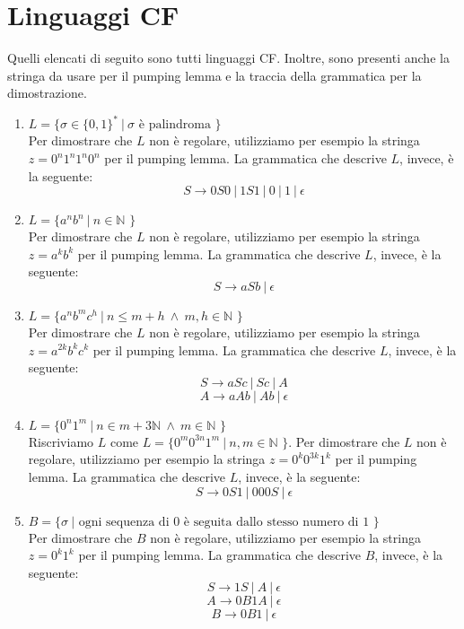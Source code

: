 \documentclass[a4paper,oneside,titlepage]{book}
\begin{document}
\section{Linguaggi CF}
Quelli elencati di seguito sono tutti linguaggi CF. Inoltre, sono presenti anche la stringa da usare per il pumping lemma e la traccia della grammatica per la dimostrazione.
\begin{enumerate}[label=\fbox{\arabic*}]
\item $L = \text{\{ } \sigma \in \{0,1\}^*  \ | \  \sigma \text{ è palindroma \}}$
\\ Per dimostrare che $L$ non è regolare, utilizziamo per esempio la stringa $z = 0^n 1^n 1^n 0^n$ per il pumping lemma. La grammatica che descrive $L$, invece, è la seguente:
\[ S \longrightarrow 0S0 \ | \  1S1 \ | \  0 \ | \  1 \ | \  \epsilon \]

\item $L = \text{\{ } a^n b^n \ | \  n \in \mathbb{N} \text{ \}}$
\\ Per dimostrare che $L$ non è regolare, utilizziamo per esempio la stringa $z = a^k b^k$ per il pumping lemma. La grammatica che descrive $L$, invece, è la seguente:
\[ S \longrightarrow aSb \ | \ \epsilon \]

\item $L = \text{\{ } a^n b^m c^h \ | \  n \leq m + h \ \wedge \ m,h \in \mathbb{N} \text{ \}}$
\\ Per dimostrare che $L$ non è regolare, utilizziamo per esempio la stringa $z = a^{2k} b^k c^k$ per il pumping lemma. La grammatica che descrive $L$, invece, è la seguente:
\[ S \longrightarrow aSc \ | \ Sc \ | \ A \]
\[ A \longrightarrow aAb \ | \ Ab \ | \ \epsilon \]

\item $L = \text{\{ } 0^n 1^m  \ | \  n \in m + 3 \mathbb{N} \ \wedge \ m \in \mathbb{N} \text{ \}}$
\\ Riscriviamo $L$ come $L = \text{\{ } 0^m 0^{3n} 1^m  \ | \  n,m \in \mathbb{N} \text{ \}}$. Per dimostrare che $L$ non è regolare, utilizziamo per esempio la stringa $z = 0^k 0^{3k} 1^k$ per il pumping lemma. La grammatica che descrive $L$, invece, è la seguente:
\[ S \longrightarrow 0S1 \ | \  000S \ | \  \epsilon \]

\item $B = \text{\{ } \sigma \ | \text{ ogni sequenza di 0 è seguita dallo stesso numero di 1 \}}$
\\ Per dimostrare che $B$ non è regolare, utilizziamo per esempio la stringa $z = 0^k 1^k$ per il pumping lemma. La grammatica che descrive $B$, invece, è la seguente:
\[ S \longrightarrow 1S \ | \ A \ | \ \epsilon \]
\[ A \longrightarrow 0B1A \ | \ \epsilon \]
\[ B \longrightarrow 0B1 \ | \ \epsilon \]


\end{enumerate}
\end{document}
